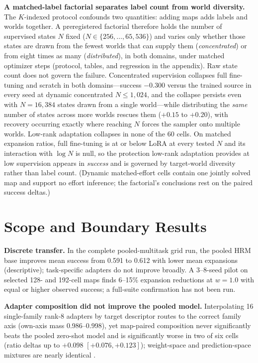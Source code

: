 \documentclass[letterpaper]{article} %
\begin{document}
\textbf{A matched-label factorial separates label count from world diversity.} The $K$-indexed protocol confounds two quantities: adding maps adds labels and worlds together. A preregistered factorial therefore holds the number of supervised states $N$ fixed ($N \in \{256, \ldots, 65{,}536\}$) and varies only whether those states are drawn from the fewest worlds that can supply them (\emph{concentrated}) or from eight times as many (\emph{distributed}), in both domains, under matched optimizer steps (protocol, tables, and regression in the appendix). Raw state count does not govern the failure. Concentrated supervision collapses full fine-tuning and scratch in both domains---success $-0.300$ versus the trained source in every seed at dynamic concentrated $N \leq 1{,}024$, and the collapse persists even with $N{=}16{,}384$ states drawn from a single world---while distributing the \emph{same} number of states across more worlds rescues them ($+0.15$ to $+0.20$), with recovery occurring exactly where reaching $N$ forces the sampler onto multiple worlds. Low-rank adaptation collapses in none of the 60 cells. On matched expansion ratios, full fine-tuning is at or below LoRA at every tested $N$ and its interaction with $\log N$ is null, so the protection low-rank adaptation provides at low supervision appears in \emph{success} and is governed by target-world diversity rather than label count. (Dynamic matched-effort cells contain one jointly solved map and support no effort inference; the factorial's conclusions rest on the paired success deltas.)

\section{Scope and Boundary Results}

\textbf{Discrete transfer.} In the complete pooled-multitask grid run, the pooled HRM base improves mean success from 0.591 to 0.612 with lower mean expansions (descriptive); task-specific adapters do not improve broadly. A 3--8-seed pilot on selected 128- and 192-cell maps finds 6--15\% expansion reductions at $w{=}1.0$ with equal or higher observed success; a full-suite confirmation has not been run.

\textbf{Adapter composition did not improve the pooled model.} Interpolating 16 single-family rank-8 adapters by target descriptor routes to the correct family axis (own-axis mass 0.986--0.998), yet map-paired composition never significantly beats the pooled zero-shot model and is significantly worse in two of six cells (ratio deltas up to $+0.098$ $[+0.076,+0.123]$); weight-space and prediction-space mixtures are nearly identical \citep{wortsman2022soups,ilharco2022task}.
\end{document}
